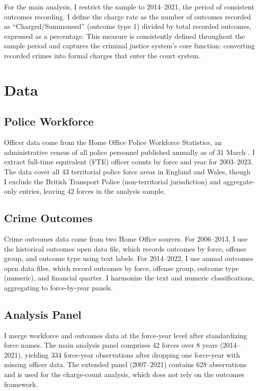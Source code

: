 \documentclass[12pt]{article}
\begin{document}
For the main analysis, I restrict the sample to 2014--2021, the period of consistent outcomes recording. I define the charge rate as the number of outcomes recorded as ``Charged/Summonsed'' (outcome type 1) divided by total recorded outcomes, expressed as a percentage. This measure is consistently defined throughout the sample period and captures the criminal justice system's core function: converting recorded crimes into formal charges that enter the court system.


\section{Data}

\subsection{Police Workforce}

Officer data come from the Home Office Police Workforce Statistics, an administrative census of all police personnel published annually as of 31 March \citep{homeoffice2023}. I extract full-time equivalent (FTE) officer counts by force and year for 2003--2023. The data cover all 43 territorial police force areas in England and Wales, though I exclude the British Transport Police (non-territorial jurisdiction) and aggregate-only entries, leaving 42 forces in the analysis sample.

\subsection{Crime Outcomes}

Crime outcomes data come from two Home Office sources. For 2006--2013, I use the historical outcomes open data file, which records outcomes by force, offense group, and outcome type using text labels. For 2014--2022, I use annual outcomes open data files, which record outcomes by force, offense group, outcome type (numeric), and financial quarter. I harmonize the text and numeric classifications, aggregating to force-by-year panels.

\subsection{Analysis Panel}

I merge workforce and outcomes data at the force-year level after standardizing force names. The main analysis panel comprises 42 forces over 8 years (2014--2021), yielding 334 force-year observations after dropping one force-year with missing officer data. The extended panel (2007--2021) contains 628 observations and is used for the charge-count analysis, which does not rely on the outcomes framework.
\end{document}
